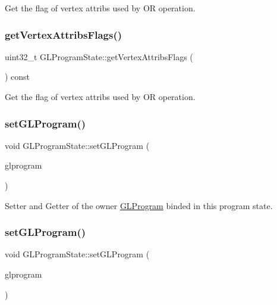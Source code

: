 Get the flag of vertex attribs used by OR operation. \mbox{\label{classGLProgramState_a05e1e9950fe6200b8ca7819e8f5e1271}} 
\subsubsection{\texorpdfstring{get\+Vertex\+Attribs\+Flags()}{getVertexAttribsFlags()}\hspace{0.1cm}{\footnotesize\ttfamily [2/2]}}
{\footnotesize\ttfamily uint32\+\_\+t G\+L\+Program\+State\+::get\+Vertex\+Attribs\+Flags (\begin{DoxyParamCaption}{ }\end{DoxyParamCaption}) const}

Get the flag of vertex attribs used by OR operation. \mbox{\label{classGLProgramState_a38a364bb0ad6f5ccae97e689dd02011e}} 
\subsubsection{\texorpdfstring{set\+G\+L\+Program()}{setGLProgram()}\hspace{0.1cm}{\footnotesize\ttfamily [1/2]}}
{\footnotesize\ttfamily void G\+L\+Program\+State\+::set\+G\+L\+Program (\begin{DoxyParamCaption}\item[{\hyperlink{classGLProgram}{G\+L\+Program} $\ast$}]{glprogram }\end{DoxyParamCaption})}

Setter and Getter of the owner \hyperlink{classGLProgram}{G\+L\+Program} binded in this program state. \mbox{\label{classGLProgramState_a38a364bb0ad6f5ccae97e689dd02011e}} 
\subsubsection{\texorpdfstring{set\+G\+L\+Program()}{setGLProgram()}\hspace{0.1cm}{\footnotesize\ttfamily [2/2]}}
{\footnotesize\ttfamily void G\+L\+Program\+State\+::set\+G\+L\+Program (\begin{DoxyParamCaption}\item[{\hyperlink{classGLProgram}{G\+L\+Program} $\ast$}]{glprogram }\end{DoxyParamCaption})}

